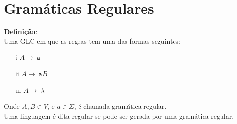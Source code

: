 \newpage
\section{Gramáticas Regulares}

\textbf{Definição}:\\

Uma GLC em que as regras tem uma das formas seguintes:

\begin{enumerate}
  \item[i] $A \rightarrow  \ \texttt{a}$   
  \item[ii] $A \rightarrow  \ \texttt{a}B$  
  \item[iii] $A \rightarrow \ \lambda$  
\end{enumerate}

Onde $A,B \in V$, e $a \in \Sigma$, é chamada {\color{red} gramática regular}.\\

Uma linguagem é dita regular se pode ser gerada por uma gramática regular. \\



